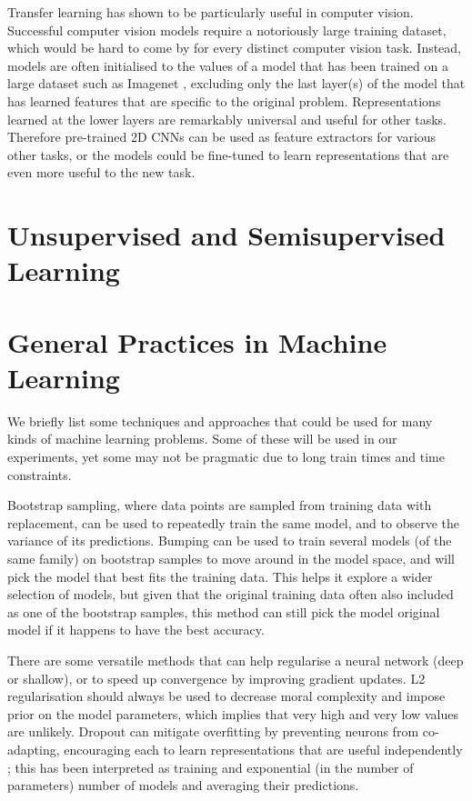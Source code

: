 Transfer learning has shown to be particularly useful in computer vision.
Successful computer vision models require a notoriously large training dataset, which would be hard to come by for every distinct computer vision task.
Instead, models are often initialised to the values of a model that has been trained on a large dataset such as Imagenet \cite{}, excluding only the last layer(s) of the model that has learned features that are specific to the original problem.
Representations learned at the lower layers are remarkably  universal and useful for other tasks.
Therefore pre-trained 2D CNNs can be used as feature extractors for various other tasks,  or the models could be fine-tuned to learn representations that are even more useful to the new task.

\section{Unsupervised and Semisupervised Learning}
\label{unsup}

\section{General Practices in Machine Learning}

We briefly list some techniques and approaches that could be used for many kinds of machine learning problems.
Some of these will be used in our experiments, yet some may not be pragmatic due to long train times and time constraints.

Bootstrap sampling, where data points are sampled from training data with replacement, can be used to repeatedly train the same model, and to observe the variance of its predictions.
Bumping can be used to train several models (of the same family) on bootstrap samples to move around in the model space, and will pick the model that best fits the training data.
This helps it explore a wider selection of models, but given that the original training data often also included as one of the bootstrap samples, this method  can still pick the model original model if it happens to have the best accuracy.

There are some versatile methods that can help regularise a neural network (deep or shallow), or to speed up convergence by improving  gradient updates.
L2  regularisation should always be used to decrease moral complexity and impose prior on the model parameters, which  implies that very high and very low values are unlikely.
Dropout can mitigate overfitting by preventing neurons from co-adapting, encouraging each to learn representations that are useful independently \cite{dropout}; this has been interpreted as training and exponential (in the number of parameters) number of models and averaging their predictions.

